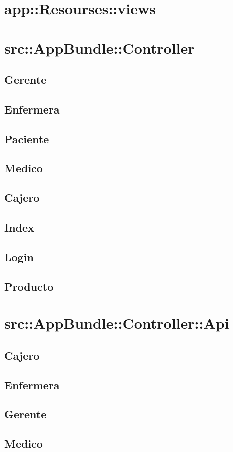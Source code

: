 	\section{app::Resourses::views}	
	\section{src::AppBundle::Controller}
	\subsection{Gerente}
	\subsection{Enfermera}
	\subsection{Paciente}
	\subsection{Medico}
	\subsection{Cajero}
	\subsection{Index}
	\subsection{Login}
	\subsection{Producto}
	\section{src::AppBundle::Controller::Api}
		\subsection{Cajero}
		\subsection{Enfermera}
		\subsection{Gerente}
		\subsection{Medico}

